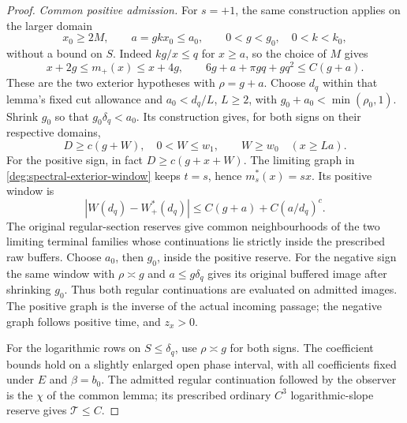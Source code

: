 \begin{proof}
\smallskip
\noindent\emph{Common positive admission.}
For \(s=+1\), the same construction applies on the larger domain
\begin{equation}\label{deg:quadratic-positive-admission}
 x_0\ge2M,\qquad a=gkx_0\le a_0,\qquad 0<g<g_0,\quad0<k<k_0,
\end{equation}
without a bound on \(S\). Indeed \(kg/x\le q\) for \(x\ge a\),
so the choice of \(M\) gives
\[
 x+2g\le m_+(x)\le x+4g,\qquad
 6g+a+\pi gq+gq^2\le C(g+a).
\]
These are the two exterior hypotheses with \(\rho=g+a\).
Choose \(d_q\) within that lemma's fixed cut allowance and
\(a_0<d_q/L\), \(L\ge2\), with \(g_0+a_0<\min(\rho_0,1)\).
Shrink \(g_0\) so that \(g_0\delta_q<a_0\).
Its construction gives, for both signs on their respective domains,
\begin{equation}\label{deg:quadratic-outer-domain}
 D\ge c(g+W),\quad 0<W\le w_1,\qquad
 W\ge w_0\quad(x\ge La).
\end{equation}
For the positive sign, in fact \(D\ge c(g+x+W)\).
The limiting graph in \eqref{deg:spectral-exterior-window} keeps
\(t=s\), hence \(m_s^*(x)=sx\). Its positive window is
\[
 |W(d_q)-W_+^*(d_q)|\le C(g+a)+C(a/d_q)^c.
\]
The original regular-section reserves give common neighbourhoods of the
two limiting terminal families whose continuations lie strictly inside
the prescribed raw buffers. Choose \(a_0\), then \(g_0\), inside the
positive reserve. For the negative sign the same window with \(\rho\asymp g\)
and \(a\le g\delta_q\) gives its original buffered image after shrinking
\(g_0\). Thus both regular continuations are evaluated on admitted
images. The positive graph is the inverse of the actual incoming
passage; the negative graph follows positive time, and \(z_x>0\).

For the logarithmic rows on \(S\le\delta_q\), use \(\rho\asymp g\)
for both signs. The coefficient bounds hold on a slightly enlarged open
phase interval, with all coefficients fixed under \(E\) and \(\beta=b_0\).
The admitted regular continuation followed by the observer is the
\(\chi\) of the common lemma; its prescribed ordinary \(C^3\)
logarithmic-slope reserve gives \(\mathcal T\le C\).


\end{proof}
